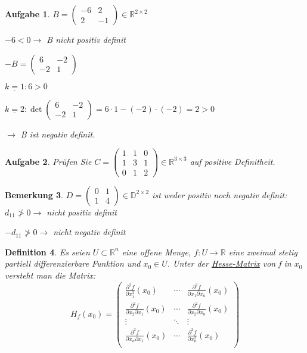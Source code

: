 \documentclass[12pt,a4paper]{scrreprt}
\newtheorem{defi}{Definition}[section]
\newtheorem{bemerkung}[defi]{Bemerkung}
\newtheorem{aufg}[defi]{Aufgabe}
\begin{document}
\begin{aufg}
	$B=\begin{pmatrix}
	-6 & 2 \\ 2 & -1
	\end{pmatrix} \in \mathbb{R}^{2\times 2}$
	
	$-6<0 \to$ B nicht positiv definit
	
	$-B=\begin{pmatrix}
	6 & -2 \\ -2 & 1
	\end{pmatrix}$
	
	$\underline{k=1}:6>0$
	
	$\underline{k=2}: \det\begin{pmatrix}
	6 & -2 \\ -2 & 1
	\end{pmatrix} = 6\cdot1 - (-2)\cdot(-2)=2>0$
	
	$\to$ B ist negativ definit.
\end{aufg}

\begin{aufg}
	Prüfen Sie $C=\begin{pmatrix}
	1 & 1 & 0 \\ 1 & 3 & 1 \\ 0 & 1 & 2
	\end{pmatrix} \in \mathbb{R}^{3\times3}$ auf positive Definitheit.
\end{aufg}

\begin{bemerkung}
	$D=\begin{pmatrix}
	0 & 1 \\ 1 & 4
	\end{pmatrix} \in \mathbb{D}^{2\times2}$ ist weder positiv noch negativ definit: $d_{11}\not>0\to$ nicht positiv definit
	
	$-d_{11}\not>0\to$ nicht negativ definit
\end{bemerkung}

\begin{defi}
	Es seien $U\subset\mathbb{R}^n$ eine offene Menge, $f:U\to\mathbb{R}$ eine zweimal stetig partiell differenzierbare Funktion und $x_0\in U$. Unter der \underline{Hesse-Matrix} von f in $x_0$ versteht man die Matrix: \[H_f(x_0)=\begin{pmatrix}
	\frac{\partial^2 f}{\partial x_1^2}(x_0) & \cdots & \frac{\partial^2 f}{\partial x_1 \partial x_n}(x_0) \\
	\frac{\partial^2 f}{\partial x_2 \partial x_1}(x_0) & \cdots & \frac{\partial^2 f}{\partial x_2 \partial x_n}(x_0) \\
	\vdots & \ddots & \vdots \\
	\frac{\partial^2 f}{\partial x_n \partial x_1}(x_0) & \cdots & \frac{\partial^2 f}{\partial x_n^2}(x_0) \\
	\end{pmatrix}\]
\end{defi}
\end{document}
